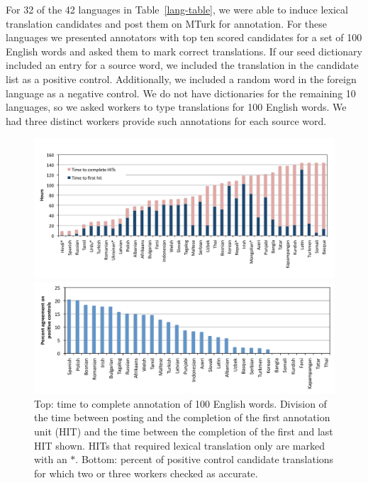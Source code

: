 \documentclass{article}
\newcommand{\tabref}[1]{Table~\ref{#1}}
\begin{document}
For 32 of the 42 languages in \tabref{lang-table}, we were able to induce lexical translation candidates and post them on MTurk for annotation. For these languages we presented annotators with top ten scored candidates for a set of 100 English words and asked them to mark correct translations. If our seed dictionary included an entry for a source word, we included the translation in the candidate list as a positive control. Additionally, we included a random word in the foreign language as a negative control.  We do not have dictionaries for the remaining 10 languages, so we asked workers to type translations for 100 English words. We had three distinct workers provide such annotations for each source word. \\ 

\begin{figure}[h!]
\centerline{\mbox{\includegraphics[width=5in]{figures/exp4/time}}}
\centerline{\mbox{\includegraphics[width=5in]{figures/exp4/controls}}}
\caption{Top: time to complete annotation of 100 English words.  Division of the time between posting and the completion of the first annotation unit (HIT) and the time between the completion of the first and last HIT shown. HITs that required lexical translation only are marked with an $*$. Bottom: percent of positive control candidate translations for which two or three workers checked as accurate.}
\label{fig:exp4}
\end{figure}
\end{document}
